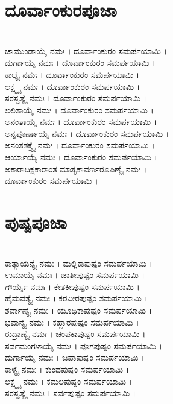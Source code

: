 \section{ದೂರ್ವಾಂಕುರಪೂಜಾ}
\\
ಚಾಮುಂಡಾಯೈ ನಮಃ । ದೂರ್ವಾಂಕುರಂ ಸಮರ್ಪಯಾಮಿ ।\\
ದುರ್ಗಾಯೈ ನಮಃ । ದೂರ್ವಾಂಕುರಂ ಸಮರ್ಪಯಾಮಿ ।\\
ಕಾಲ್ಯೈ ನಮಃ । ದೂರ್ವಾಂಕುರಂ ಸಮರ್ಪಯಾಮಿ ।\\
ಲಕ್ಷ್ಮ್ಯೈ ನಮಃ । ದೂರ್ವಾಂಕುರಂ ಸಮರ್ಪಯಾಮಿ ।\\
ಸರಸ್ವತ್ಯೈ ನಮಃ । ದೂರ್ವಾಂಕುರಂ ಸಮರ್ಪಯಾಮಿ ।\\
ಲಲಿತಾಯೈ ನಮಃ । ದೂರ್ವಾಂಕುರಂ ಸಮರ್ಪಯಾಮಿ ।\\
ಅನಂತಾಯೈ ನಮಃ । ದೂರ್ವಾಂಕುರಂ ಸಮರ್ಪಯಾಮಿ ।\\
ಅನ್ನಪೂರ್ಣಾಯೈ ನಮಃ । ದೂರ್ವಾಂಕುರಂ ಸಮರ್ಪಯಾಮಿ ।\\
ಅನಂತಶಕ್ತ್ಯೈ ನಮಃ । ದೂರ್ವಾಂಕುರಂ ಸಮರ್ಪಯಾಮಿ ।\\
ಆರ್ಯಾಯೈ ನಮಃ । ದೂರ್ವಾಂಕುರಂ ಸಮರ್ಪಯಾಮಿ ।\\
ಅಕಾರಾದಿಕ್ಷಕಾರಾಂತ ಮಾತೃಕಾವರ್ಣರೂಪಿಣ್ಯೈ ನಮಃ ।\\ ದೂರ್ವಾಂಕುರಂ ಸಮರ್ಪಯಾಮಿ ।
\newpage
\section{ಪುಷ್ಪಪೂಜಾ}
\\
ಕಾತ್ಯಾಯನ್ಯೈ ನಮಃ । ಮಲ್ಲಿಕಾಪುಷ್ಪಂ ಸಮರ್ಪಯಾಮಿ ।\\
ಉಮಾಯೈ ನಮಃ । ಜಾತೀಪುಷ್ಪಂ ಸಮರ್ಪಯಾಮಿ ।\\
ಗೌರ್ಯೈ ನಮಃ । ಕೇತಕೀಪುಷ್ಪಂ ಸಮರ್ಪಯಾಮಿ ।\\
ಹೈಮವತ್ಯೈ ನಮಃ । ಕರವೀರಪುಷ್ಪಂ ಸಮರ್ಪಯಾಮಿ ।\\
ಶರ್ವಾಣ್ಯೈ ನಮಃ । ಯೂಥಿಕಾಪುಷ್ಪಂ ಸಮರ್ಪಯಾಮಿ ।\\
ಭವಾನ್ಯೈ ನಮಃ । ಕಹ್ಲಾರಪುಷ್ಪಂ ಸಮರ್ಪಯಾಮಿ ।\\
ರುದ್ರಾಣ್ಯೈ ನಮಃ । ಚಂಪಕಾಪುಷ್ಪಂ ಸಮರ್ಪಯಾಮಿ ।\\
ಸರ್ವಮಂಗಳಾಯೈ ನಮಃ । ಪೂಗಪುಷ್ಪಂ ಸಮರ್ಪಯಾಮಿ ।\\
ದುರ್ಗಾಯೈ ನಮಃ । ಜಪಾಪುಷ್ಪಂ ಸಮರ್ಪಯಾಮಿ ।\\
ಕಾಳ್ಯೈ ನಮಃ । ಕುಂದಪುಷ್ಪಂ ಸಮರ್ಪಯಾಮಿ ।\\
ಲಕ್ಷ್ಮ್ಯೈ ನಮಃ । ಕಮಲಪುಷ್ಪಂ ಸಮರ್ಪಯಾಮಿ ।\\
ಸರಸ್ವತ್ಯೈ ನಮಃ । ಸರ್ವಪುಷ್ಪಂ ಸಮರ್ಪಯಾಮಿ ।
